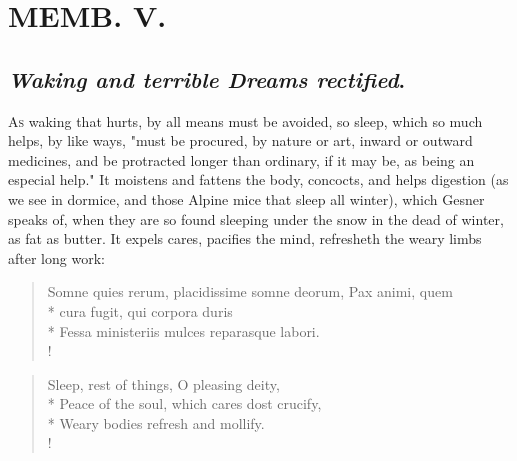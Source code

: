 {\chapter{MEMB. V.}

\section{\emph{Waking and terrible Dreams rectified}.}

\lettrine{A}{s} waking that hurts, by all means must be avoided, so sleep, which so much helps, by like ways, "must be procured, by nature or art, inward or outward medicines, and be protracted longer than ordinary, if it may be, as being an especial help." It moistens and fattens the body, concocts, and helps digestion (as we see in dormice, and those Alpine mice that sleep all winter), which Gesner speaks of, when they are so found sleeping under the snow in the dead of winter, as fat as butter. It expels cares, pacifies the mind, refresheth the weary limbs after long work:

%
\begin{latin}%
\begin{verse}%
Somne quies rerum, placidissime somne deorum, Pax animi, quem\\*
cura fugit, qui corpora duris\\*
Fessa ministeriis mulces reparasque labori.\\!
\end{verse}%
\end{latin}%
\translationrule%
\begin{verse}%
Sleep, rest of things, O pleasing deity,\\*
Peace of the soul, which cares dost crucify,\\*
Weary bodies refresh and mollify.\\!
\end{verse}%

}
